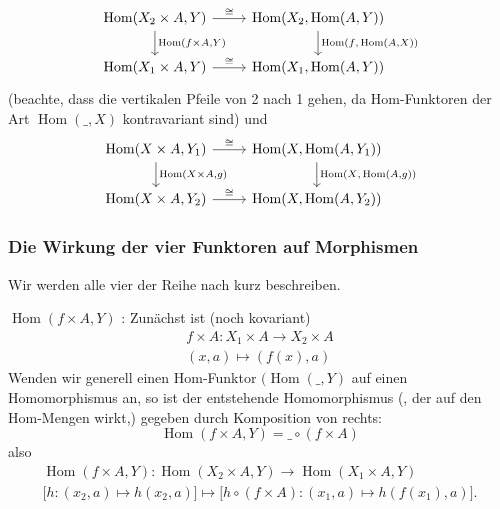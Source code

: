 \documentclass[a4paper]{amsart}
\theoremstyle{definition}
\DeclareMathOperator{\Hom}{Hom}
\begin{document}
\begin{equation}
   \begin{tikzcd}
      \Hom(X_2 \times A, Y ) \arrow[r, "\cong"]   
      \arrow[d, "\Hom(f \times A {,} Y   )"] 
                                                & \Hom(X_2, \Hom( A, Y)) 
      \arrow[d, "\Hom(f{,} \Hom( A{,} X) )"]\\
      \Hom(X_1 \times A, Y ) \arrow[r, "\cong"] & \Hom(X_1, \Hom( A, Y))
   \end{tikzcd}
\end{equation}
(beachte, dass die vertikalen Pfeile von 2 nach 1 gehen, da Hom-Funktoren der Art $\Hom(\_, X)$ kontravariant sind) und
\begin{equation}
   \begin{tikzcd}
      \Hom(X \times A, Y_1 ) \arrow[r, "\cong"]   
      \arrow[d, "\Hom(X \times A {,} g   )"] 
      & \Hom(X, \Hom( A, Y_1)) 
      \arrow[d, "\Hom(X{,} \Hom( A{,} g) )"]\\
      \Hom(X \times A, Y_2 ) \arrow[r, "\cong"] & \Hom(X, \Hom( A, Y_2))
   \end{tikzcd}
\end{equation}

\subsubsection{Die Wirkung der vier Funktoren auf Morphismen}
Wir werden alle vier der Reihe nach kurz beschreiben.

\boldmath ${\Hom(f \times A {,} Y   )}$ \unboldmath: Zunächst ist (noch kovariant)
\begin{align}
   f \times A \colon X_1 \times A \to X_2 \times A\\
   (x,a) \mapsto (f(x),a)
\end{align}
Wenden wir generell einen Hom-Funktor $(\Hom( \_, Y)$ auf einen Homomorphismus an, so ist der entstehende Homomorphismus (, der auf den Hom-Mengen wirkt,) gegeben durch Komposition von rechts:
\begin{equation}
   \Hom(f \times A {,} Y   ) = \_ \circ (f \times A)
\end{equation}
also
\begin{align}
   \Hom( f \times A, Y) \colon \Hom(X_2 \times A, Y ) \to \Hom(X_1 \times A, Y )\\
   \big [ h \colon (x_2,a) \mapsto h(x_2,a) \big ] \mapsto \big [ h \circ (f \times A) \colon (x_1,a) \mapsto h(f(x_1),a) \big ].
\end{align}
\end{document}
